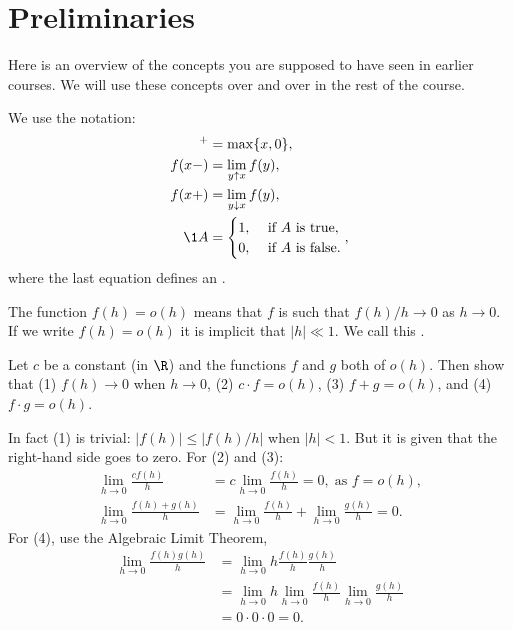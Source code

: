 \section{Preliminaries}
\label{sec:preliminaries}




Here is an overview of the concepts you are supposed to have seen in earlier courses.
We will use these concepts over and over in the rest of the course.


We use the notation:
  \begin{align*}
  [x]^+ &= \max\{x, 0\}, \\
  f(x-) &= \lim_{y\uparrow x} f(y),\\
  f(x+) &= \lim_{y\downarrow x} f(y),\\
    \1{A} &=
            \begin{cases}
              1, & \text{ if $A$ is true}, \\
              0, & \text{ if $A$ is false}.
            \end{cases}, 
\end{align*}
where the last equation defines an .


The function $f(h)=o(h)$ means that $f$ is such that $f(h)/h \to 0$ as $h\to 0$.
If we write $f(h) = o(h)$ it is implicit that $|h| \ll 1$.
We call this .
\begin{exercise}
  Let $c$ be a constant (in $\R$) and the functions $f$ and $g$ both of $o(h)$. Then show that (1) $f(h) \to 0$ when $h\to 0$, (2) $c\cdot f = o(h)$, (3) $f+g=o(h)$, and (4) $f\cdot g=o(h)$. 
\begin{solution}
     In fact (1) is trivial: $|f(h)| \leq |f(h)/h|$ when $|h| < 1$.
     But it is given that the right-hand side goes to zero.
     For (2) and (3):
\begin{align*}
\lim_{h\to 0} \frac{c f(h)}{h} &=  c \lim_{h\to 0} \frac{f(h)}{h} = 0, \; \text{as } f = o(h), \\
\lim_{h\to 0} \frac{f(h) + g(h)} h &= \lim_{h\to 0} \frac{f(h)} h + \lim_{h\to 0} \frac{g(h)} h = 0.
\end{align*}
For (4), use  the Algebraic Limit Theorem,
\begin{align*}
\lim_{h\to 0} \frac{f(h)g(h)}{h} &= \lim_{h\to 0} h \frac{f(h)}{h} \frac{g(h)}{h} \\
&= \lim_{h\to 0} h \lim_{h\to 0} \frac{f(h)}{h} \lim_{h\to 0} \frac{g(h)}{h} \\
&= 0 \cdot 0 \cdot 0 = 0.
\end{align*}
\end{solution}
\end{exercise}


